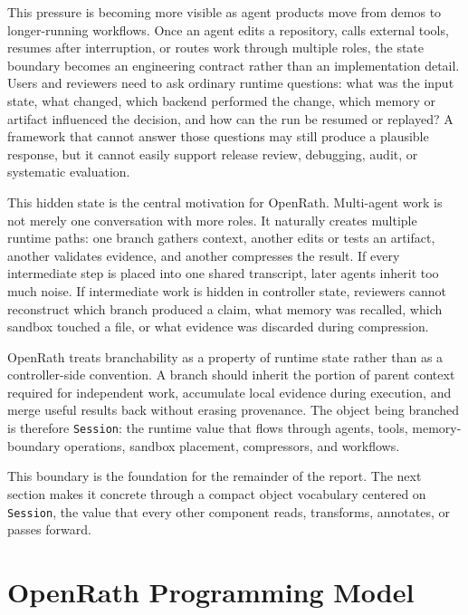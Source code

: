 \documentclass{llmxive}
\begin{document}
This pressure is becoming more visible as agent products move from demos to
longer-running workflows. Once an agent edits a repository, calls external
tools, resumes after interruption, or routes work through multiple roles, the
state boundary becomes an engineering contract rather than an implementation
detail. Users and reviewers need to ask ordinary runtime questions: what was
the input state, what changed, which backend performed the change, which memory
or artifact influenced the decision, and how can the run be resumed or
replayed? A framework that cannot answer those questions may still produce a
plausible response, but it cannot easily support release review, debugging,
audit, or systematic evaluation.

This hidden state is the central motivation for OpenRath. Multi-agent work is
not merely one conversation with more roles. It naturally creates multiple
runtime paths: one branch gathers context, another edits or tests an artifact,
another validates evidence, and another compresses the result. If every
intermediate step is placed into one shared transcript, later agents inherit too
much noise. If intermediate work is hidden in controller state, reviewers cannot
reconstruct which branch produced a claim, what memory was recalled, which
sandbox touched a file, or what evidence was discarded during compression.

OpenRath treats branchability as a property of runtime state rather than as a controller-side convention. A branch should inherit the portion of parent context required for independent work, accumulate local evidence during execution, and merge useful results back without erasing provenance. The object being branched is therefore \texttt{Session}: the runtime value that flows through agents, tools, memory-boundary operations, sandbox placement, compressors, and workflows.

This boundary is the foundation for the remainder of the report. The next section makes it concrete through a compact object vocabulary centered on \texttt{Session}, the value that every other component reads, transforms, annotates, or passes forward.



\section{OpenRath Programming Model}
\end{document}
